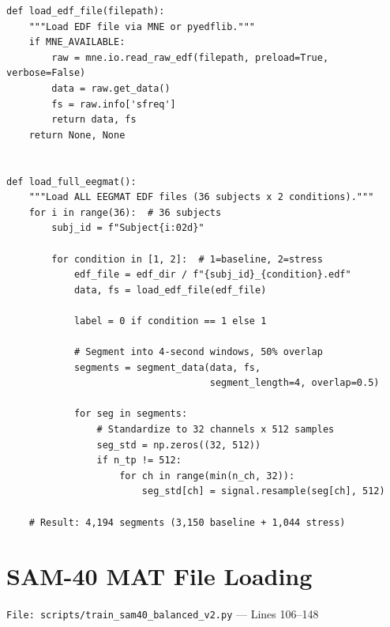 \documentclass[11pt,a4paper]{article}
\begin{document}
\begin{lstlisting}[caption={Loading 72 EDF files from 36 EEGMAT subjects}]
def load_edf_file(filepath):
    """Load EDF file via MNE or pyedflib."""
    if MNE_AVAILABLE:
        raw = mne.io.read_raw_edf(filepath, preload=True, verbose=False)
        data = raw.get_data()
        fs = raw.info['sfreq']
        return data, fs
    return None, None


def load_full_eegmat():
    """Load ALL EEGMAT EDF files (36 subjects x 2 conditions)."""
    for i in range(36):  # 36 subjects
        subj_id = f"Subject{i:02d}"

        for condition in [1, 2]:  # 1=baseline, 2=stress
            edf_file = edf_dir / f"{subj_id}_{condition}.edf"
            data, fs = load_edf_file(edf_file)

            label = 0 if condition == 1 else 1

            # Segment into 4-second windows, 50% overlap
            segments = segment_data(data, fs,
                                    segment_length=4, overlap=0.5)

            for seg in segments:
                # Standardize to 32 channels x 512 samples
                seg_std = np.zeros((32, 512))
                if n_tp != 512:
                    for ch in range(min(n_ch, 32)):
                        seg_std[ch] = signal.resample(seg[ch], 512)

    # Result: 4,194 segments (3,150 baseline + 1,044 stress)
\end{lstlisting}

\section{SAM-40 MAT File Loading}
\texttt{File: scripts/train\_sam40\_balanced\_v2.py} --- Lines 106--148
\end{document}
